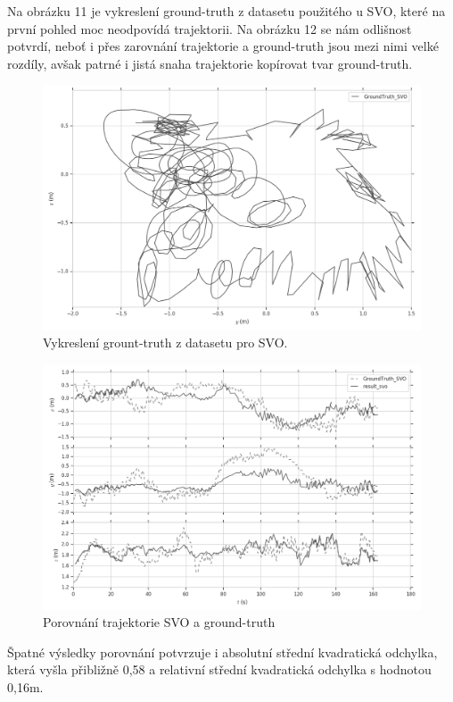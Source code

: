\documentclass[12pt,a4paper]{article}
\begin{document}
Na obrázku 11 je vykreslení ground-truth z datasetu použitého u SVO, které na první pohled moc neodpovídá trajektorii. Na obrázku 12 se nám odlišnost potvrdí, neboť i přes zarovnání trajektorie a ground-truth jsou mezi nimi velké rozdíly, avšak patrné i jistá snaha trajektorie kopírovat tvar ground-truth.

\begin{figure}[H]
\centering
\includegraphics[scale=0.5]{img/xy_SVO_gt.png}
\caption{Vykreslení grount-truth z datasetu pro SVO.}
\end{figure}

\begin{figure}[H]
\centering
\includegraphics[scale=0.5]{img/xyz_SVO.png}
\caption{Porovnání trajektorie SVO a ground-truth}
\end{figure} 

Špatné výsledky porovnání potvrzuje i absolutní střední kvadratická odchylka, která vyšla přibližně 0,58 a relativní střední kvadratická odchylka s hodnotou 0,16m.
\end{document}

